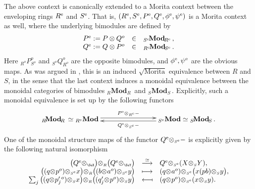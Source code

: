 \documentclass[reqno, a4paper, 10pt]{amsart}
\numberwithin{equation}{section}
\theoremstyle{plain}
\theoremstyle{definition}
\theoremstyle{remark}
\begin{document}
The above context is canonically extended to a Morita context between the enveloping rings ${{R^{\rm e}}}$ and ${{S^{\rm e}}}$. 
That is, $({{R^{\rm e}}},{{S^{\rm e}}},{{P^{\rm e}}},{{Q^{\rm e}}},\phi^{\rm e},\psi^{\rm e})$ is a Morita context as well, 
where the underlying bimodules are defined by 
$$
\begin{array}{rcl}
{{P^{\rm e}}} :=  P \otimes Q^{{{o}}} &\in& {{}_{{{{S^{\rm e}}} \!}} {{\mathbf{Mod}}}_{{\! {{R^{\rm e}}}}}\,}, \\
{{Q^{\rm e}}} :=  Q \otimes P^{{{o}}} &\in& {{}_{{{{R^{\rm e}}} \!}} {{\mathbf{Mod}}}_{{\! {{S^{\rm e}}}}}\,}. 
\end{array}
$$
Here ${}_{R^{{{o}}}}P^{{{o}}}_{S^{{{o}}}}$ and ${}_{S^{{{o}}}}Q^{{{o}}}_{R^{{{o}}}}$ are the opposite 
bimodules, and $\phi^{\rm e},\psi^{\rm e}$ are the obvious maps. As was argued in \cite{Tak:squareMorita}, this is an induced $\sqrt{\mbox{Morita}}$ equivalence between $R$ and $S$, in the sense that the last context induces a monoidal equivalence between the monoidal categories of bimodules $ {{}_{{R \!}} {{\mathbf{Mod}}}_{{\! R}}\,}$ and $ {{}_{{S \!}} {{\mathbf{Mod}}}_{{\! S}}\,}$. 
Explicitly, such a monoidal equivalence is set up by the following functors
$$
\xymatrix@C=80pt{ {{}_{{R \!}} {{\mathbf{Mod}}}_{{\! R}}\,} \simeq {}_{{R^{\rm e}}}{\mathbf{Mod}}  \ar@<.5ex>[r]^-{{{P^{\rm e}}}{\otimes_{\scriptscriptstyle{{\scriptscriptstyle{{R^{\rm e}}}}}}}-} &  {}_{{S^{\rm e}}}{\mathbf{Mod}} \simeq {{}_{{S \!}} {{\mathbf{Mod}}}_{{\! S}}\,}.  \ar@<.5ex>[l]^-{{{Q^{\rm e}}}{\otimes_{\scriptscriptstyle{{{S^{\rm e}}}}}}-} }
$$
One of the monoidal structure maps of the functor ${{Q^{\rm e}}}{\otimes_{\scriptscriptstyle{{{S^{\rm e}}}}}}-$ is explicitly given by the following natural isomorphism
\begin{equation}\label{Eq:Phi}
\begin{array}{rcl}
{\big( {{{Q^{\rm e}}}{\otimes_{\scriptscriptstyle{\SeX}}}} \big)}{\otimes_{\scriptscriptstyle{{R}}}} {\big( {{{Q^{\rm e}}}{\otimes_{\scriptscriptstyle{\SeY}}}} \big)} &\overset{\simeq}{ \longrightarrow  }& {{Q^{\rm e}}}{\otimes_{\scriptscriptstyle{{{S^{\rm e}}}}}}(X{\otimes_{\scriptscriptstyle{{S}}}}Y), \\ 
{\big( {(q{\otimes_{\scriptscriptstyle{{}}}}p^o) {\otimes_{\scriptscriptstyle{{{S^{\rm e}}}}}} x} \big)} {\otimes_{\scriptscriptstyle{{R}}}} {\big( {(b{\otimes_{\scriptscriptstyle{{}}}}a^o) {\otimes_{\scriptscriptstyle{{{S^{\rm e}}}}}} y} \big)}  &{ \longmapsto  }& (q{\otimes_{\scriptscriptstyle{{}}}}a^o) {\otimes_{\scriptscriptstyle{{{S^{\rm e}}}}}} {\big( {x(pb){\otimes_{\scriptscriptstyle{{S}}}}y} \big)}, \\ 
\sum_j {\big( {(q{\otimes_{\scriptscriptstyle{{}}}}p'_j{}^o){\otimes_{\scriptscriptstyle{{S}}}}x} \big)}{\otimes_{\scriptscriptstyle{{R}}}}{\big( {(q_j'{}{\otimes_{\scriptscriptstyle{{}}}}p^o){\otimes_{\scriptscriptstyle{{S}}}}y} \big)} &\longmapsfrom& (q{\otimes_{\scriptscriptstyle{{}}}}p^o){\otimes_{\scriptscriptstyle{{{S^{\rm e}}}}}}(x{\otimes_{\scriptscriptstyle{{S}}}}y).
\end{array}
\end{equation}
\end{document}
